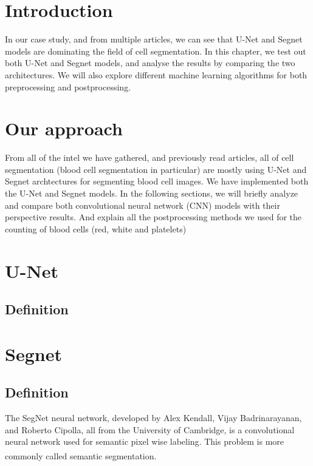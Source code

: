 \section{Introduction}
\vspace{0.2in}
\hspace*{0.16in}
In our case study, and from multiple articles, we can see that U-Net and Segnet models are dominating the field of cell segmentation.
In this chapter, we test out both U-Net and Segnet models, and analyse the results by comparing the two architectures.
We will also explore different machine learning algorithms for both preprocessing and postprocessing.

\section{Our approach}
\vspace{0.2in}
\hspace*{0.16in}
From all of the intel we have gathered, and previously read articles, all of cell segmentation (blood cell segmentation in particular) are mostly using U-Net and Segnet archtectures for segmenting blood cell images.
We have implemented both the U-Net and Segnet models.
In the following sections, we will briefly analyze and compare both convolutional neural network (CNN) models with their perspective results.
And explain all the postprocessing methods we used for the counting of blood cells (red, white and platelets)

\section{U-Net}
\subsection{Definition}
\lipsum[2-2]

\section{Segnet}
\subsection{Definition}
The SegNet neural network, developed by Alex Kendall, Vijay Badrinarayanan, and Roberto Cipolla, all from the University of Cambridge, is a convolutional neural network used for semantic pixel wise labeling. This problem is more commonly called semantic segmentation. \textsuperscript{\cite{badrinarayanan2017segnet}}

